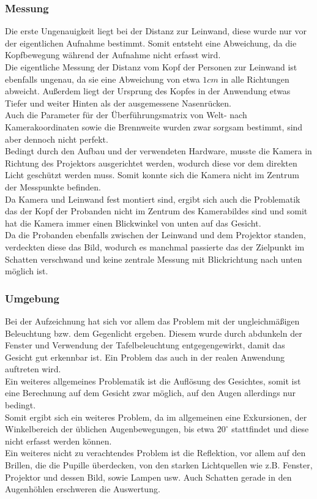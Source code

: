 \subsubsection{Messung}
Die erste Ungenauigkeit liegt bei der Distanz zur Leinwand, diese wurde nur vor der eigentlichen Aufnahme bestimmt. Somit entsteht eine Abweichung, da die Kopfbewegung während der Aufnahme nicht erfasst wird.\\
Die eigentliche Messung der Distanz  vom Kopf der Personen zur Leinwand ist ebenfalls ungenau, da sie eine Abweichung von etwa $1cm$ in alle Richtungen abweicht. Außerdem liegt der Ursprung des Kopfes in der Anwendung etwas Tiefer und weiter Hinten als der ausgemessene Nasenrücken.\\
Auch die Parameter für der Überführungsmatrix von Welt- nach Kamerakoordinaten sowie die Brennweite wurden zwar sorgsam bestimmt, sind aber dennoch nicht perfekt.\\
Bedingt durch den Aufbau und der verwendeten Hardware, musste die Kamera in Richtung des Projektors ausgerichtet werden, wodurch diese vor dem direkten Licht geschützt werden muss. Somit konnte sich die Kamera nicht im Zentrum der Messpunkte befinden.\\
Da Kamera und Leinwand fest montiert sind, ergibt sich auch die Problematik das der Kopf der Probanden nicht im Zentrum des Kamerabildes sind und somit hat die Kamera immer einen Blickwinkel von unten auf das Gesicht.\\
Da die Probanden ebenfalls zwischen der Leinwand und dem Projektor standen, verdeckten diese das Bild, wodurch es manchmal passierte das der Zielpunkt im Schatten verschwand und keine zentrale Messung mit Blickrichtung nach unten möglich ist.
\subsubsection{Umgebung}
Bei der Aufzeichnung hat sich vor allem das Problem mit der ungleichmäßigen Beleuchtung bzw. dem Gegenlicht ergeben. Diesem wurde durch abdunkeln der Fenster und Verwendung der Tafelbeleuchtung entgegengewirkt, damit das Gesicht gut erkennbar ist. Ein Problem das auch in der realen Anwendung auftreten wird.\\
Ein weiteres allgemeines Problematik ist die Auflösung des Gesichtes, somit ist eine Berechnung auf dem Gesicht zwar möglich, auf den Augen allerdings nur bedingt.\\
Somit ergibt sich ein weiteres Problem, da im allgemeinen eine Exkursionen, der Winkelbereich der üblichen Augenbewegungen, bis etwa  $20^\circ$ stattfindet \cite{wiki_Gesichtsfeld} und diese nicht erfasst werden können.\\
Ein weiteres nicht zu verachtendes Problem ist die Reflektion, vor allem auf den Brillen, die die Pupille überdecken, von den starken Lichtquellen wie z.B. Fenster, Projektor und dessen Bild, sowie Lampen usw. Auch Schatten gerade in den Augenhöhlen erschweren die Auswertung.